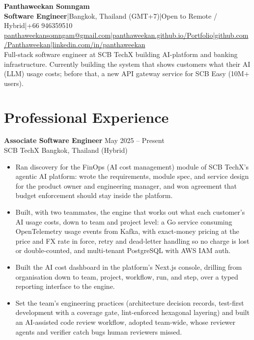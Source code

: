 \documentclass[10pt]{article}
\newcommand{\meta}[1]{\textcolor{textmuted}{#1}}
\newcommand{\sep}{\enspace\textcolor{rulegray}{|}\enspace}
\newcommand{\entry}[4]{%
  \textbf{#1} \hfill \meta{#2}\\
  #3 \meta{\textperiodcentered{} #4}%
}
\newcommand{\subhead}[3]{%
  \vspace{4pt}{\small\textbf{#1}\sep\meta{#2} \hfill \meta{#3}}\par\vspace{-2pt}%
}
\begin{document}
\color{textdark}
\RaggedRight

{\LARGE \textbf{Panthaweekan Somngam}}\\[4pt]
\textbf{Software Engineer}\sep Bangkok, Thailand (GMT+7)\sep Open to Remote / Hybrid\sep +66 946359510\\[1pt]
{\small\href{mailto:panthaweekansomngam@gmail.com}{panthaweekansomngam@gmail.com}\sep \href{https://panthaweekan.github.io/Portfolio/}{panthaweekan.github.io/Portfolio}\sep \href{https://github.com/Panthaweekan}{github.com/Panthaweekan}\sep \href{https://www.linkedin.com/in/panthaweekan/}{linkedin.com/in/panthaweekan}}\\[5pt]
Full-stack software engineer at SCB TechX building AI-platform and banking infrastructure. Currently building the system that shows customers what their AI (LLM) usage costs; before that, a new API gateway service for SCB Easy (10M+ users).

\section*{Professional Experience}

\entry{Associate Software Engineer}{May 2025 -- Present}{SCB TechX}{Bangkok, Thailand (Hybrid)}

\subhead{Agentic AI Platform --- FinOps Engine}{Go, Kafka, OpenTelemetry, PostgreSQL, AWS, Next.js, TypeScript}{Sep 2026 -- Present}
\begin{itemize}
  \item Ran discovery for the FinOps (AI cost management) module of SCB TechX's agentic AI platform: wrote the requirements, module spec, and service design for the product owner and engineering manager, and won agreement that budget enforcement should stay inside the platform.
  \item Built, with two teammates, the engine that works out what each customer's AI usage costs, down to team and project level: a Go service consuming OpenTelemetry usage events from Kafka, with exact-money pricing at the price and FX rate in force, retry and dead-letter handling so no charge is lost or double-counted, and multi-tenant PostgreSQL with AWS IAM auth.
  \item Built the AI cost dashboard in the platform's Next.js console, drilling from organisation down to team, project, workflow, run, and step, over a typed reporting interface to the engine.
  \item Set the team's engineering practices (architecture decision records, test-first development with a coverage gate, lint-enforced hexagonal layering) and built an AI-assisted code review workflow, adopted team-wide, whose reviewer agents and verifier catch bugs human reviewers missed.
\end{itemize}
\end{document}
